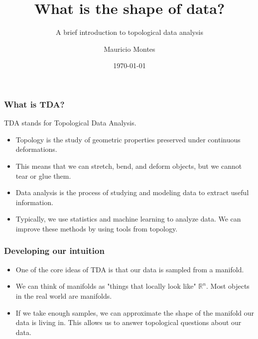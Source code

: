 \documentclass{beamer}
\title{What is the shape of data?}
\subtitle{A brief introduction to topological data analysis}
\author{Mauricio Montes}
\institute{Auburn University}
\date{\today}
\begin{document}
\frame{\titlepage}

\begin{frame}%

\frametitle{What is TDA?}

TDA stands for Topological Data Analysis.

\pause

\begin{itemize}

\item Topology is the study of geometric properties preserved under continuous deformations.

\pause

\item This means that we can stretch, bend, and deform objects, but we cannot tear or glue them.

\pause

\item Data analysis is the process of studying and modeling data to extract useful information.

\pause

\item Typically, we use statistics and machine learning to analyze data. We can
improve these methods by using tools from topology. 

\end{itemize}



\end{frame}
\begin{frame}%

\frametitle{Developing our intuition}

\pause


\begin{itemize}

\item One of the core ideas of TDA is that our data is sampled from a manifold.

\pause

\item We can think of manifolds as "things that locally look like"
$\mathbb{R}^n$. Most objects in the real world are manifolds. 

\pause

\item If we take enough samples, we can approximate the shape of the manifold our data is living in.
  This allows us to answer topological questions about our data. 

\end{itemize}

\end{frame}
\end{document}
